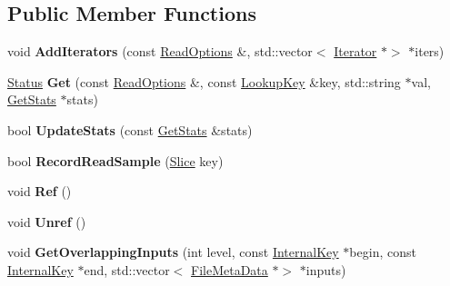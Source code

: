 \subsection*{Public Member Functions}
\begin{DoxyCompactItemize}
\item 
\mbox{\label{classleveldb_1_1_version_a6a1056992a12e327d9b156aa00edb270}} 
void {\bfseries Add\+Iterators} (const \mbox{\hyperlink{structleveldb_1_1_read_options}{Read\+Options}} \&, std\+::vector$<$ \mbox{\hyperlink{classleveldb_1_1_iterator}{Iterator}} $\ast$$>$ $\ast$iters)
\item 
\mbox{\label{classleveldb_1_1_version_a42c439d4a2a767fe281c7a75d4255038}} 
\mbox{\hyperlink{classleveldb_1_1_status}{Status}} {\bfseries Get} (const \mbox{\hyperlink{structleveldb_1_1_read_options}{Read\+Options}} \&, const \mbox{\hyperlink{classleveldb_1_1_lookup_key}{Lookup\+Key}} \&key, std\+::string $\ast$val, \mbox{\hyperlink{structleveldb_1_1_version_1_1_get_stats}{Get\+Stats}} $\ast$stats)
\item 
\mbox{\label{classleveldb_1_1_version_a7e5b8451deb7c4b9006fd9d5ccfc2cef}} 
bool {\bfseries Update\+Stats} (const \mbox{\hyperlink{structleveldb_1_1_version_1_1_get_stats}{Get\+Stats}} \&stats)
\item 
\mbox{\label{classleveldb_1_1_version_a8b9e51b3d0503fe5868f656356557ded}} 
bool {\bfseries Record\+Read\+Sample} (\mbox{\hyperlink{classleveldb_1_1_slice}{Slice}} key)
\item 
\mbox{\label{classleveldb_1_1_version_ad237b446c7f7d9e63c4b7c162d6f0064}} 
void {\bfseries Ref} ()
\item 
\mbox{\label{classleveldb_1_1_version_a3f623697f625d4740d5b273c0bf6223a}} 
void {\bfseries Unref} ()
\item 
\mbox{\label{classleveldb_1_1_version_af3d28a0710b0b497512651353e2f8a4f}} 
void {\bfseries Get\+Overlapping\+Inputs} (int level, const \mbox{\hyperlink{classleveldb_1_1_internal_key}{Internal\+Key}} $\ast$begin, const \mbox{\hyperlink{classleveldb_1_1_internal_key}{Internal\+Key}} $\ast$end, std\+::vector$<$ \mbox{\hyperlink{structleveldb_1_1_file_meta_data}{File\+Meta\+Data}} $\ast$$>$ $\ast$inputs)

\end{DoxyCompactItemize}
